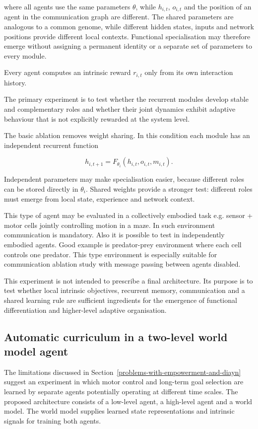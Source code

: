 where all agents use the same parameters $\theta$, while $h_{i,t}$, $o_{i,t}$ and the position of an agent in the communication graph are different. The shared parameters are analogous to a common genome, while different hidden states, inputs and network positions provide different local contexts. Functional specialisation may therefore emerge without assigning a permanent identity or a separate set of parameters to every module.

Every agent computes an intrinsic reward $r_{i,t}$ only from its own interaction history.

The primary experiment is to test whether the recurrent modules develop stable and complementary roles and whether their joint dynamics exhibit adaptive behaviour that is not explicitly rewarded at the system level. 

The basic ablation removes weight sharing. In this condition each module has an independent recurrent function

\begin{equation}
h_{i,t+1} = F_{\theta_i}(h_{i,t}, o_{i,t}, m_{i,t}).
\end{equation}

Independent parameters may make specialisation easier, because different roles can be stored directly in $\theta_i$. Shared weights provide a stronger test: different roles must emerge from local state, experience and network context. 

This type of agent may be evaluated in a collectively embodied task e.g. sensor + motor cells jointly controlling motion in a maze. In such environment communication is mandatory. Also it is possible to test in independently embodied agents. Good example is predator-prey environment where each cell controls one predator. This type environment is especially suitable for communication ablation study with message passing between agents disabled.

This experiment is not intended to prescribe a final architecture. Its purpose is to test whether local intrinsic objectives, recurrent memory, communication and a shared learning rule are sufficient ingredients for the emergence of functional differentiation and higher-level adaptive organisation.

\subsection{Automatic curriculum in a two-level world model agent}

The limitations discussed in Section~\ref{problems-with-empowerment-and-diayn} suggest an experiment in which motor control and long-term goal selection are learned by separate agents potentially operating at different time scales. The proposed architecture consists of a low-level agent, a high-level agent and a world model. The world model supplies learned state representations and intrinsic signals for training both agents.

